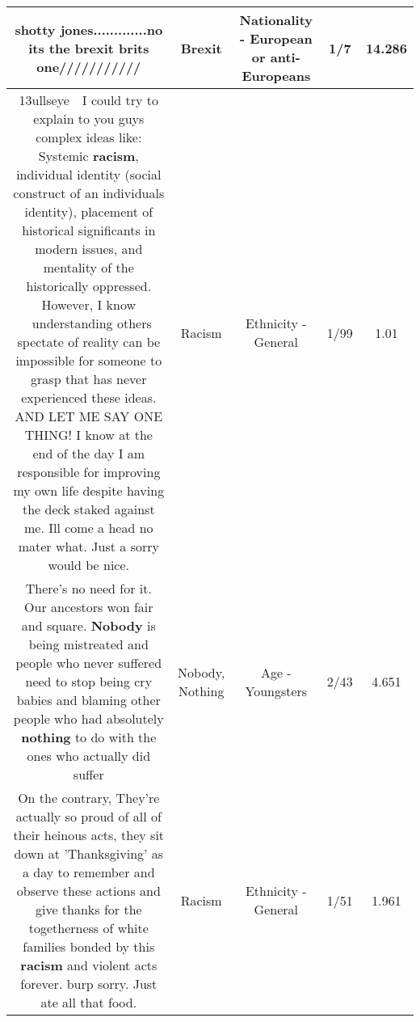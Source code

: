 \documentclass[11pt]{article}
\newlength\mylength
\begin{document}
\begin{center}
\begin{longtable}{|C{.65\mylength}|C{.30\mylength}|C{.12\mylength}|C{.12\mylength}|C{.12\mylength}|}
  \small shotty jones.............no its the \textbf{brexit} brits one///////////\normalsize   & Brexit & Nationality - European or anti-Europeans & 1/7 & 14.286 \\  \hline
  \small \@13ullseye  I could try to explain to you guys complex ideas like: Systemic \textbf{racism}, individual identity (social construct of an individuals identity), placement of historical significants in modern issues, and mentality of the historically oppressed. However, I know  understanding others spectate of reality can be impossible for someone to grasp that has never experienced these ideas. AND LET ME SAY ONE THING! I know at the end of the day I am responsible for improving my own life despite having the deck staked against me. Ill come a head no mater what. Just a sorry would be nice.\normalsize   & Racism & Ethnicity - General & 1/99 & 1.01 \\  \hline
  \small There's no need for it. Our ancestors won fair and square. \textbf{Nobody} is being mistreated and people who never suffered need to stop being cry babies and blaming other people who had absolutely \textbf{nothing} to do with the ones who actually did suffer\normalsize   & Nobody, Nothing & Age - Youngsters & 2/43 & 4.651 \\  \hline
  \small On the contrary, They're actually so proud of all of their heinous acts, they sit down at 'Thanksgiving' as a day to remember and observe these actions and give thanks for the togetherness of white families bonded by this \textbf{racism} and violent acts forever.  burp sorry. Just ate all that food.\normalsize   & Racism & Ethnicity - General & 1/51 & 1.961 \\  \hline

\end{longtable}
\end{center}
\end{document}
